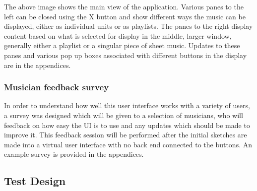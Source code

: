 The above image shows the main view of the application. Various panes to the left can be closed using the X button and show different ways the music can be displayed, either as individual units or as playlists. The panes to the right display content based on what is selected for display in the middle, larger window, generally either a playlist or a singular piece of sheet music. Updates to these panes and various pop up boxes associated with different buttons in the display are in the appendices.
\subsubsection{Musician feedback survey}
In order to understand how well this user interface works with a variety of users, a survey was designed which will be given to a selection of musicians, who will feedback on how easy the UI is to use and any updates which should be made to improve it. This feedback session will be performed after the initial sketches are made into a virtual user interface with no back end connected to the buttons. An example survey is provided in the appendices.
\subsection{Test Design}